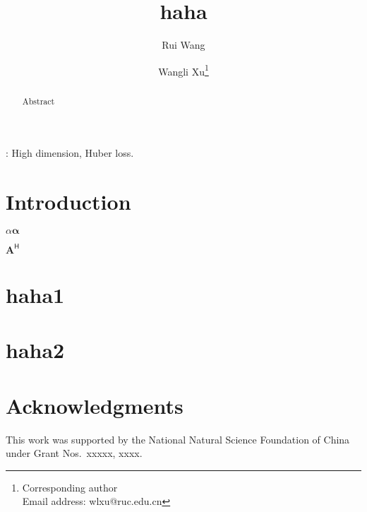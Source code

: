 \documentclass[11pt]{article}
\newcommand{\BA}{\mathbf{A}}    \newcommand{\BB}{\mathbf{B}}    \newcommand{\BC}{\mathbf{C}}    \newcommand{\BD}{\mathbf{D}}    \newcommand{\BE}{\mathbf{E}}    \newcommand{\BF}{\mathbf{F}}    \newcommand{\BG}{\mathbf{G}}    \newcommand{\BH}{\mathbf{H}}    \newcommand{\BI}{\mathbf{I}}    \newcommand{\BJ}{\mathbf{J}}    \newcommand{\BK}{\mathbf{K}}    \newcommand{\BL}{\mathbf{L}}
\theoremstyle{plain}
\theoremstyle{definition}
\theoremstyle{remark}
\begin{document}
\title{haha}

\author[1]{Rui Wang}
\author[1]{Wangli Xu\thanks{Corresponding author\\Email address: wlxu@ruc.edu.cn}}

\maketitle
\begin{abstract}
   Abstract 
\end{abstract}

: High dimension, Huber loss.
\section{Introduction}
$\alpha
\boldsymbol{\alpha}
$


$\BA^\mathsf H$

\begin{appendices}
    \section{haha1}
    \section{haha2}
\end{appendices}
\section*{Acknowledgments}
This work was supported by the National Natural Science Foundation of China under Grant Nos.\ xxxxx, xxxx.





\end{document}
